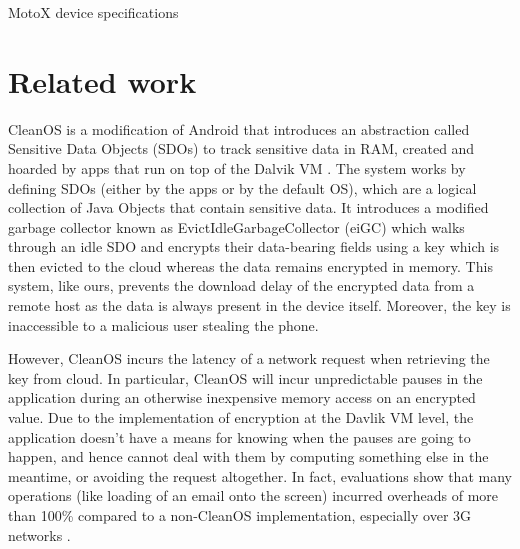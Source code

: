 \documentclass[conference,10pt]{IEEEtran}
\begin{document}
\begin{table}[]
\centering
\caption{MotoX device specifications}
\label{table:specs}
\end{table}




\section{Related work}
CleanOS is a modification of Android that introduces an abstraction called Sensitive Data Objects (SDOs) to 
track sensitive data in RAM, created and hoarded by apps that run on top of the Dalvik VM 
\cite{cleanos}. The system works by defining SDOs (either by the apps or by the default OS), which are a 
logical collection of Java Objects that contain sensitive data. It introduces a modified garbage collector 
known as EvictIdleGarbageCollector (eiGC) which walks through an idle SDO and encrypts their data-bearing 
fields using a key which is then evicted to the cloud whereas the data remains encrypted in memory.  This 
system, like ours, prevents the download delay of the encrypted data from a remote host as the data is 
always present in the device itself. Moreover, the key is inaccessible to a malicious user stealing the 
phone.

However, CleanOS incurs the latency of a network request when retrieving the key from cloud.  In 
particular, CleanOS will incur unpredictable pauses in the application during an otherwise inexpensive 
memory access on an encrypted value. Due to the implementation of encryption at the Davlik VM level, the 
application doesn't have a means for knowing when the pauses are going to happen, and hence cannot deal 
with them by computing something else in the meantime, or avoiding the request altogether.  In fact, 
evaluations show that many operations (like loading of an email onto the screen) incurred overheads of more 
than 100\% compared to a non-CleanOS implementation, especially over 3G networks \cite{cleanos}.
\end{document}

